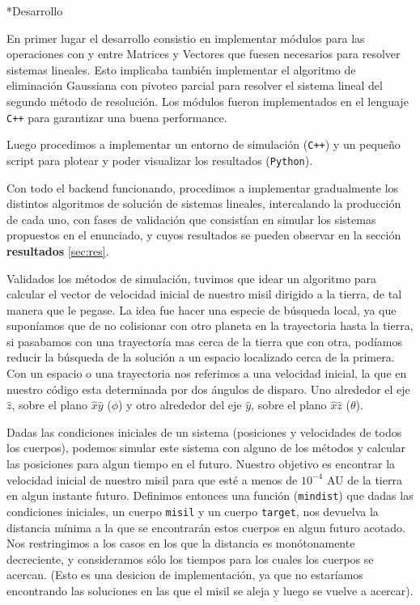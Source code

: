 \documentclass[12pt,titlepage]{article}
\newenvironment{usection}[1]{\newpage\begin{section}*{#1}	\addcontentsline{toc}{section}{#1}}{\end{section}}
\begin{document}
	\begin{usection}{Desarrollo}

		En primer lugar el desarrollo consistio en implementar módulos
		para las operaciones con y entre Matrices y Vectores que
		fuesen necesarios para resolver sistemas lineales. Esto
		implicaba también implementar el algoritmo de eliminación
		Gaussiana con pivoteo parcial para resolver el sistema lineal
		del segundo método de resolución. Los módulos fueron
		implementados en el lenguaje \texttt{C++} para garantizar una
		buena performance.

		Luego procedimos a implementar un entorno de simulación
		(\texttt{C++}) y un pequeño script para plotear y poder
		visualizar los resultados (\texttt{Python}). 

		Con todo el backend funcionando, procedimos a implementar
		gradualmente los distintos algoritmos de solución de sistemas
		lineales, intercalando la producción de cada uno, con fases de
		validación que consistían en simular los sistemas propuestos
		en el enunciado, y cuyos resultados se pueden observar en la
		sección \textbf{resultados} \ref{sec:res}.

		Validados los métodos de simulación, tuvimos que idear un
		algoritmo para calcular el vector de velocidad inicial de
		nuestro misil dirigido a la tierra, de tal manera que le pegase.
		La idea fue hacer una especie de búsqueda local, ya que
		suponíamos que de no colisionar con otro planeta en la
		trayectoria hasta la tierra, si pasabamos con una trayectoría
		mas cerca de la tierra que con otra, podíamos reducir la
		búsqueda de la solución a un espacio localizado cerca de la
		primera. Con un espacio o una trayectoria nos referimos a una
		velocidad inicial, la que en nuestro código esta determinada por
		dos ángulos de disparo. Uno alrededor el eje $\hat{z}$, sobre el
		plano $\hat{x}\hat{y}$ ($\phi$) y otro alrededor del eje $\hat{y}$, sobre
		el plano $\hat{x}\hat{z}$ ($\theta$).
		
		Dadas las condiciones iniciales de un sistema (posiciones y velocidades de todos los cuerpos), podemos simular este sistema con alguno de los métodos y calcular las posiciones para algun tiempo en el futuro.
		Nuestro objetivo es encontrar la velocidad inicial de nuestro misil para que esté a menos de $10^{-4}$ AU de la tierra en algun instante futuro.
		Definimos entonces una función (\texttt{mindist}) que dadas las condiciones iniciales, un cuerpo \texttt{misil} y un cuerpo \texttt{target}, nos devuelva la distancia mínima a la que se encontrarán estos cuerpos en algun futuro acotado.
		Nos restringimos a los casos en los que la distancia es monótonamente decreciente, y consideramos sólo los tiempos para los cuales los cuerpos se acercan. (Esto es una desicion de implementación, ya que no estaríamos encontrando las soluciones en las que el misil se aleja y luego se vuelve a acercar).
		

\end{usection}
\end{document}
